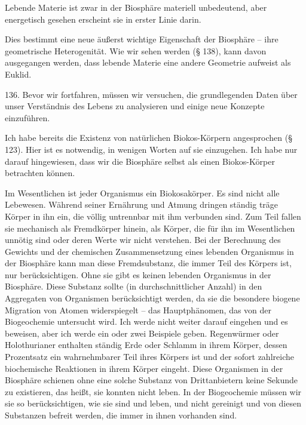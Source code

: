 \documentclass[11pt,a4paper]{book}
\begin{document}
Lebende Materie ist zwar in der Biosphäre materiell unbedeutend, aber energetisch gesehen erscheint sie in erster Linie darin.



Dies bestimmt eine neue äußerst wichtige Eigenschaft der Biosphäre -- ihre geometrische Heterogenität. Wie wir sehen werden (§ 138), kann davon ausgegangen werden, dass lebende Materie eine andere Geometrie aufweist als Euklid.



136. Bevor wir fortfahren, müssen wir versuchen, die grundlegenden Daten über unser Verständnis des Lebens zu analysieren und einige neue Konzepte einzuführen.



Ich habe bereits die Existenz von natürlichen Biokos-Körpern angesprochen (§ 123). Hier ist es notwendig, in wenigen Worten auf sie einzugehen. Ich habe nur darauf hingewiesen, dass wir die Biosphäre selbst als einen Biokos-Körper betrachten können.



Im Wesentlichen ist jeder Organismus ein Biokosakörper. Es sind nicht alle Lebewesen. Während seiner Ernährung und Atmung dringen ständig träge Körper in ihn ein, die völlig untrennbar mit ihm verbunden sind. Zum Teil fallen sie mechanisch als Fremdkörper hinein, als Körper, die für ihn im Wesentlichen unnötig sind oder deren Werte wir nicht verstehen. Bei der Berechnung des Gewichts und der chemischen Zusammensetzung eines lebenden Organismus in der Biosphäre kann man diese Fremdsubstanz, die immer Teil des Körpers ist, nur berücksichtigen. Ohne sie gibt es keinen lebenden Organismus in der Biosphäre. Diese Substanz sollte (in durchschnittlicher Anzahl) in den Aggregaten von Organismen berücksichtigt werden, da sie die besondere biogene Migration von Atomen widerspiegelt -- das Hauptphänomen, das von der Biogeochemie untersucht wird. Ich werde nicht weiter darauf eingehen und es beweisen, aber ich werde ein oder zwei Beispiele geben. Regenwürmer oder Holothurianer enthalten ständig Erde oder Schlamm in ihrem Körper, dessen Prozentsatz ein wahrnehmbarer Teil ihres Körpers ist und der sofort zahlreiche biochemische Reaktionen in ihrem Körper eingeht. Diese Organismen in der Biosphäre schienen ohne eine solche Substanz von Drittanbietern keine Sekunde zu existieren, das heißt, sie konnten nicht leben. In der Biogeochemie müssen wir sie so berücksichtigen, wie sie sind und leben, und nicht gereinigt und von diesen Substanzen befreit werden, die immer in ihnen vorhanden sind.
\end{document}
